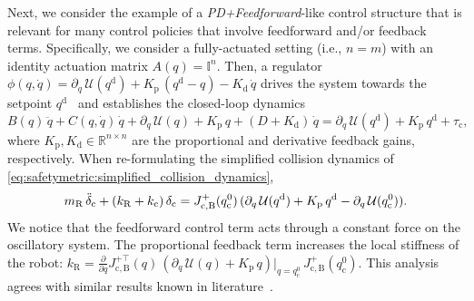 Next, we consider the example of a \emph{PD+Feedforward}-like control structure that is relevant for many control policies that involve feedforward and/or feedback terms.
Specifically, we consider a fully-actuated setting (i.e., $n=m$) with an identity actuation matrix $A(q) = \mathbb{I}^n$.
Then, a regulator $\phi(q,\dot{q}) = \partial_{q} \, \mathcal{U}( q^\mathrm{d}) + K_\mathrm{p} \, (q^\mathrm{d}-q) - K_\mathrm{d} \, \dot{q}$ drives the system towards the setpoint $q^\mathrm{d}$~\citep{della2023model} and establishes the closed-loop dynamics
\begin{equation}
    B(q) \, \ddot{q} + C(q, \dot{q}) \, \dot{q} + \partial_{q} \, \mathcal{U}(q) + K_\mathrm{p} \, q + (D+K_\mathrm{d}) \, \dot{q} = \partial_{q} \, \mathcal{U}( q^\mathrm{d}) + K_\mathrm{p} \, q^\mathrm{d} + \tau_\mathrm{c},
\end{equation}
where $K_\mathrm{p}, K_\mathrm{d} \in \mathbb{R}^{n \times n}$ are the proportional and derivative feedback gains, respectively.
When re-formulating the simplified collision dynamics of \eqref{eq:safetymetric:simplified_collision_dynamics}, 
\begin{equation}
    m_\mathrm{R} \, \Ddot{\delta}_\mathrm{c} + (k_\mathrm{R} + k_\mathrm{c}) \, \delta_\mathrm{c} = J_\mathrm{c,B}^{+}(q_{\mathrm{c}}^0) \, (\partial_{q} \, \mathcal{U}(q^\mathrm{d}) +  K_\mathrm{p} \, q^\mathrm{d} - \partial_{q} \, \mathcal{U}(q_{\mathrm{c}}^0)).
\end{equation}
We notice that the feedforward control term acts through a constant force on the oscillatory system.
The proportional feedback term increases the local stiffness of the robot: $k_\mathrm{R} = \frac{\partial}{\partial q} J_\mathrm{c,B}^{+\top}(q) \, \left ( \partial_{q} \, \mathcal{U}(q) + K_\mathrm{p} \, q \right )\Big |_{q=q_{\mathrm{c}}^0} \,  J_\mathrm{c,B}^{+}(q_{\mathrm{c}}^0)$.
This analysis agrees with similar results known in literature~\citep{della2017controlling}.

